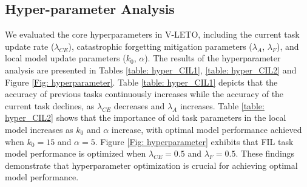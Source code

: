 \subsection{Hyper-parameter Analysis}
We evaluated the core hyperparameters in V-LETO, including the current task update rate ($\lambda_{CE}$), catastrophic forgetting mitigation parameters ($\lambda_{A}$, $\lambda_{F}$), and local model update parameters ($k_0$, $\alpha$).
The results of the hyperparameter analysis are presented in Tables \ref{table: hyper_CIL1}, \ref{table: hyper_CIL2} and Figure \ref{Fig: hyperparameter}.
Table \ref{table: hyper_CIL1} depicts that the accuracy of previous tasks continuously increases while the accuracy of the current task declines, as $\lambda_{CE}$ decreases and $\lambda_{A}$ increases.
Table \ref{table: hyper_CIL2} shows that the importance of old task parameters in the local model increases as $k_0$ and $\alpha$ increase, with optimal model performance achieved when $k_0 = 15$ and $\alpha = 5$. 
Figure \ref{Fig: hyperparameter} exhibits that FIL task model performance is optimized when $\lambda_{CE} = 0.5$ and $\lambda_{F} = 0.5$.
These findings demonstrate that hyperparameter optimization is crucial for achieving optimal model performance.

